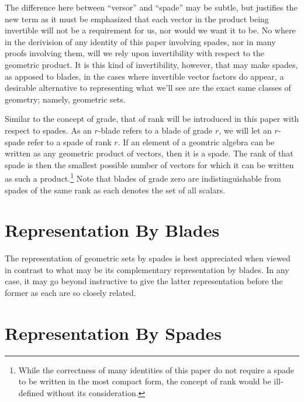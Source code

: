 \documentclass{birkjour}
\theoremstyle{definition}
\theoremstyle{remark}
\numberwithin{equation}{section}
\begin{document}
The difference here between ``versor'' and ``spade'' may be subtle, but justifies the new term as it must be emphasized that each
vector in the product being invertible will not be a requirement for us, nor would we want it to be.  No where in
the derivision of any identity of this paper involving spades, nor in many proofs involving them, will we rely upon invertibility
with respect to the geometric product.  It is this kind of invertibility, however, that may make spades, as apposed to blades, in the
cases where invertible vector factors do appear, a desirable
alternative to representing what we'll see are the exact same classes of geometry; namely, geometric sets.

Similar to the concept of grade, that of rank will be introduced in this paper with respect to spades.  As an $r$-blade
refers to a blade of grade $r$, we will let an $r$-spade refer to a spade of rank $r$.  If an element of a geomtric
algebra can be written as any geometric product of vectors, then it is a spade.  The rank of that spade is then the smallest
possible number of vectors for which it can be written as such a product.\footnote{While the correctness of many identities of this paper
do not require a spade to be written in the most compact form, the concept of rank would be ill-defined without its consideration.}   Note that blades of grade zero
are indistinguishable from spades of the same rank as each denotes the set of all scalars.


\section{Representation By Blades}

The representation of geometric sets by spades is best appreciated when viewed in contrast to what may be its complementary representation by blades.
In any case, it may go beyond instructive to give the latter representation before the former as each are so closely related.

\section{Representation By Spades}
\end{document}
